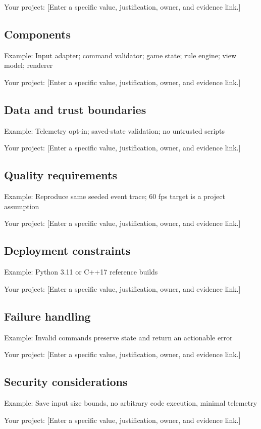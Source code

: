 \documentclass[11pt]{article}
\begin{document}
Your project: [Enter a specific value, justification, owner, and evidence link.]


\subsection{Components}
Example: Input adapter; command validator; game state; rule engine; view model; renderer

Your project: [Enter a specific value, justification, owner, and evidence link.]


\subsection{Data and trust boundaries}
Example: Telemetry opt-in; saved-state validation; no untrusted scripts

Your project: [Enter a specific value, justification, owner, and evidence link.]


\subsection{Quality requirements}
Example: Reproduce same seeded event trace; 60 fps target is a project assumption

Your project: [Enter a specific value, justification, owner, and evidence link.]


\subsection{Deployment constraints}
Example: Python 3.11 or C++17 reference builds

Your project: [Enter a specific value, justification, owner, and evidence link.]


\subsection{Failure handling}
Example: Invalid commands preserve state and return an actionable error

Your project: [Enter a specific value, justification, owner, and evidence link.]


\subsection{Security considerations}
Example: Save input size bounds, no arbitrary code execution, minimal telemetry

Your project: [Enter a specific value, justification, owner, and evidence link.]
\end{document}
